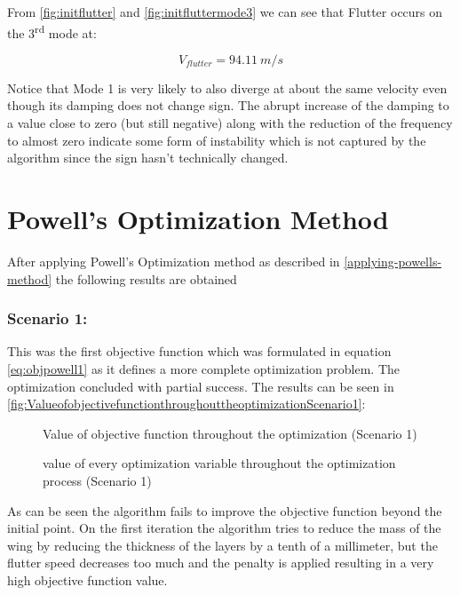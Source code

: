 From \autoref{fig:initflutter} and \autoref{fig:initfluttermode3} we can see that Flutter occurs on the
3\textsuperscript{rd} mode at:

\begin{equation}
V_{flutter} = 94.11\ m/s
\end{equation}

Notice that Mode 1 is very likely to also diverge at about the same
velocity even though its damping does not change sign. The abrupt
increase of the damping to a value close to zero (but still negative)
along with the reduction of the frequency to almost zero indicate some
form of instability which is not captured by the algorithm since the
sign hasn't technically changed.

\section{Powell's Optimization Method}
\label{powells-optimization-method}

After applying Powell's Optimization method as described in \autoref{applying-powells-method} the following results are obtained

\subsubsection{Scenario 1:}

This was the first objective function which was formulated in equation \eqref{eq:objpowell1} as it defines a more complete optimization problem. The optimization concluded with partial success. The results can be seen in \autoref{fig:ValueofobjectivefunctionthroughouttheoptimizationScenario1}:
\begin{figure}[H]
    \centering
    
    \caption{Value of objective function throughout the optimization (Scenario 1)}
    \label{fig:ValueofobjectivefunctionthroughouttheoptimizationScenario1}
\end{figure}

\begin{figure}[H]
    \centering
    
    \caption{value of every optimization variable throughout the optimization process (Scenario 1)
    }
\end{figure}

As can be seen the algorithm fails to improve the objective function beyond the initial point. On the first iteration the algorithm tries to reduce the mass of the wing by reducing the thickness of the layers by a tenth of a millimeter, but the flutter speed decreases too much and the penalty is applied resulting in a very high objective function value.


